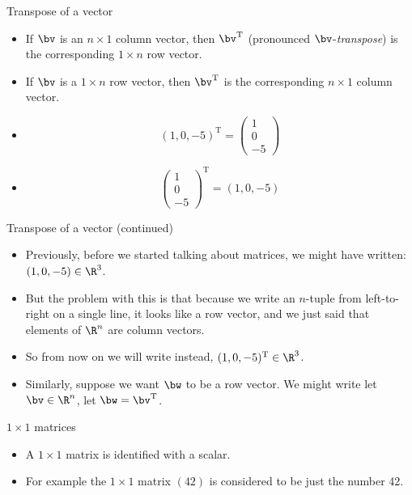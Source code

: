 \documentclass{beamer}
\begin{document}
\begin{frame}{Transpose of a vector}

\begin{itemize}
\item If $\bv$ is an $n\times 1$ column vector, then $\bv^{\text{T}}$
(pronounced $\bv$-\emph{transpose}) is the corresponding $1\times n$ row vector.
\item If $\bv$ is a $1\times n$ row vector, then $\bv^{\text{T}}$ is the
corresponding $n\times 1$ column vector.
\item $$(1, 0, -5)^{\text{T}} = \begin{pmatrix} 1 \\ 0 \\ -5 \end{pmatrix}$$
\item $$\begin{pmatrix} 1 \\ 0 \\ -5 \end{pmatrix}^{\text{T}} =  (1, 0, -5)$$
\end{itemize}
\end{frame}

\begin{frame}{Transpose of a vector (continued)}

\begin{itemize}
\item Previously, before we started talking about matrices, we might have
written: $(1, 0, -5)\in\R^3$.
\item But the problem with this is that because we write an $n$-tuple from
left-to-right on a single line, it looks like a row vector, and we just said
that elements of $\R^n$ are column vectors.
\item So from now on we will write instead, $(1, 0, -5)^{\text{T}}\in\R^3$.
\item Similarly, suppose we want $\bw$ to be a row vector. We might write
let $\bv\in\R^n$, let $\bw=\bv^{\text{T}}$.
\end{itemize}
\end{frame}



\begin{frame}{$1\times 1$ matrices}

\begin{itemize}
\item A $1\times 1$ matrix is identified with a scalar.
\item For example the $1\times 1$ matrix $(42)$ is considered to
be just the number 42.
\end{itemize}

\end{frame}
\end{document}
